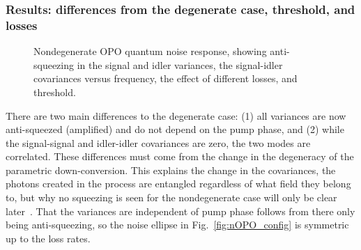 \subsubsection{Results: differences from the degenerate case, threshold, and losses}
\label{sec:nOPO_results}

\begin{figure}
	\centering
	\caption{Nondegenerate OPO quantum noise response, showing anti-squeezing in the signal and idler variances, the signal-idler covariances versus frequency, the effect of different losses, and threshold.}
	\label{fig:nOPO_variances}
\end{figure}

There are two main differences to the degenerate case: (1) all variances are now anti-squeezed (amplified) and do not depend on the pump phase, and (2) while the signal-signal and idler-idler covariances are zero, the two modes are correlated. These differences must come from the change in the degeneracy of the parametric down-conversion.
This explains the change in the covariances, the photons created in the process are entangled regardless of what field they belong to, but why no squeezing is seen for the nondegenerate case will only be clear later~\cite{}.
That the variances are independent of pump phase follows from there only being anti-squeezing, so the noise ellipse in Fig.~\ref{fig:nOPO_config} is symmetric up to the loss rates.

